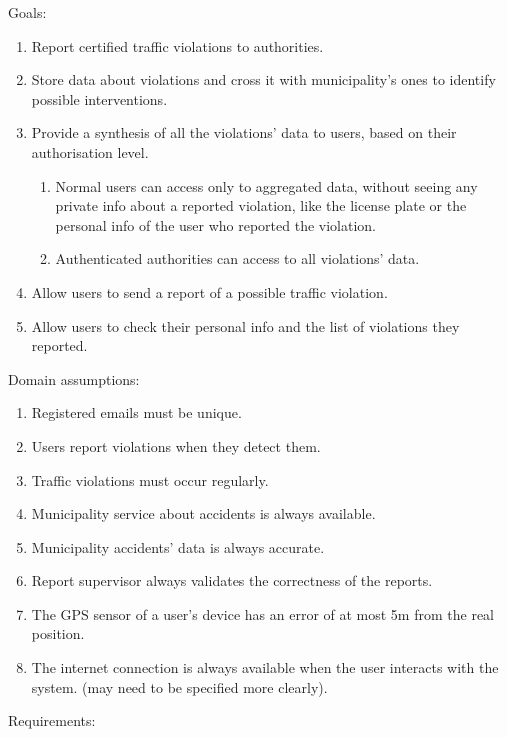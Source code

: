 \bigskip
Goals:
\begin{enumerate}[label={G\arabic*.}]
    \item Report certified traffic violations to authorities.
    \item Store data about violations and cross it with municipality's ones to identify possible interventions.
    \item Provide a synthesis of all the violations' data to users, based on their authorisation level.
    \begin{enumerate}[label={G\arabic{enumi}.\arabic*.}]
    	\item Normal users can access only to aggregated data, without seeing any private info about a reported violation, like the license plate or the personal info of the user who reported the violation.
    	\item Authenticated authorities can access to all violations' data.
    \end{enumerate}
	\item Allow users to send a report of a possible traffic violation.
	\item Allow users to check their personal info and the list of violations they reported.
\end{enumerate}
Domain assumptions:
\begin{enumerate}[label={D\arabic*.}]
	\item Registered emails must be unique.
    \item Users report violations when they detect them.
    \item Traffic violations must occur regularly.
    \item Municipality service about accidents is always available.
   	\item Municipality accidents' data is always accurate.
    \item Report supervisor always validates the correctness of the reports.
    \item The GPS sensor of a user's device has an error of at most 5m from the real position.
    \item The internet connection is always available when the user interacts with the system. (may need to be specified more clearly).
\end{enumerate}
Requirements:

